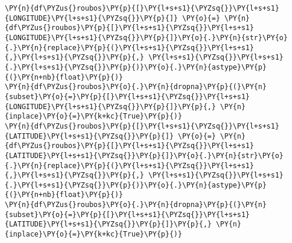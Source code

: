     \begin{tcolorbox}[breakable, size=fbox, boxrule=1pt, pad at break*=1mm,colback=cellbackground, colframe=cellborder]
\begin{Verbatim}[commandchars=\\\{\}]
\PY{n}{df\PYZus{}roubos}\PY{p}{[}\PY{l+s+s1}{\PYZsq{}}\PY{l+s+s1}{LONGITUDE}\PY{l+s+s1}{\PYZsq{}}\PY{p}{]} \PY{o}{=} \PY{n}{df\PYZus{}roubos}\PY{p}{[}\PY{l+s+s1}{\PYZsq{}}\PY{l+s+s1}{LONGITUDE}\PY{l+s+s1}{\PYZsq{}}\PY{p}{]}\PY{o}{.}\PY{n}{str}\PY{o}{.}\PY{n}{replace}\PY{p}{(}\PY{l+s+s1}{\PYZsq{}}\PY{l+s+s1}{,}\PY{l+s+s1}{\PYZsq{}}\PY{p}{,} \PY{l+s+s1}{\PYZsq{}}\PY{l+s+s1}{.}\PY{l+s+s1}{\PYZsq{}}\PY{p}{)}\PY{o}{.}\PY{n}{astype}\PY{p}{(}\PY{n+nb}{float}\PY{p}{)}
\PY{n}{df\PYZus{}roubos}\PY{o}{.}\PY{n}{dropna}\PY{p}{(}\PY{n}{subset}\PY{o}{=}\PY{p}{[}\PY{l+s+s1}{\PYZsq{}}\PY{l+s+s1}{LONGITUDE}\PY{l+s+s1}{\PYZsq{}}\PY{p}{]}\PY{p}{,} \PY{n}{inplace}\PY{o}{=}\PY{k+kc}{True}\PY{p}{)}
\PY{n}{df\PYZus{}roubos}\PY{p}{[}\PY{l+s+s1}{\PYZsq{}}\PY{l+s+s1}{LATITUDE}\PY{l+s+s1}{\PYZsq{}}\PY{p}{]} \PY{o}{=} \PY{n}{df\PYZus{}roubos}\PY{p}{[}\PY{l+s+s1}{\PYZsq{}}\PY{l+s+s1}{LATITUDE}\PY{l+s+s1}{\PYZsq{}}\PY{p}{]}\PY{o}{.}\PY{n}{str}\PY{o}{.}\PY{n}{replace}\PY{p}{(}\PY{l+s+s1}{\PYZsq{}}\PY{l+s+s1}{,}\PY{l+s+s1}{\PYZsq{}}\PY{p}{,} \PY{l+s+s1}{\PYZsq{}}\PY{l+s+s1}{.}\PY{l+s+s1}{\PYZsq{}}\PY{p}{)}\PY{o}{.}\PY{n}{astype}\PY{p}{(}\PY{n+nb}{float}\PY{p}{)}
\PY{n}{df\PYZus{}roubos}\PY{o}{.}\PY{n}{dropna}\PY{p}{(}\PY{n}{subset}\PY{o}{=}\PY{p}{[}\PY{l+s+s1}{\PYZsq{}}\PY{l+s+s1}{LATITUDE}\PY{l+s+s1}{\PYZsq{}}\PY{p}{]}\PY{p}{,} \PY{n}{inplace}\PY{o}{=}\PY{k+kc}{True}\PY{p}{)}
\end{Verbatim}
\end{tcolorbox}

